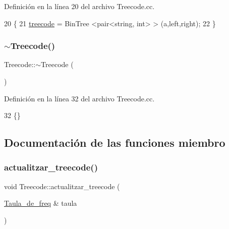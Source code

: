 Definición en la línea 20 del archivo Treecode.\+cc.


\begin{DoxyCode}
20                                                                                                            
                          \{
21     \hyperlink{class_treecode_abd4467b0a13a57fcd3bddf4a60853372}{treecode} = BinTree <pair<string, int> > (a,left,right);
22 \}
\end{DoxyCode}
\mbox{\label{class_treecode_a4b25e99b1a356dbcf9901c1e63105b1b}} 
\subsubsection{\texorpdfstring{$\sim$\+Treecode()}{~Treecode()}}
{\footnotesize\ttfamily Treecode\+::$\sim$\+Treecode (\begin{DoxyParamCaption}{ }\end{DoxyParamCaption})}



Definición en la línea 32 del archivo Treecode.\+cc.


\begin{DoxyCode}
32 \{\}
\end{DoxyCode}


\subsection{Documentación de las funciones miembro}
\mbox{\label{class_treecode_a9b9e9d2f0cce1d4293a7e28ab0ba76f7}} 
\subsubsection{\texorpdfstring{actualitzar\+\_\+treecode()}{actualitzar\_treecode()}}
{\footnotesize\ttfamily void Treecode\+::actualitzar\+\_\+treecode (\begin{DoxyParamCaption}\item[{\hyperlink{class_taula__de__freq}{Taula\+\_\+de\+\_\+freq} \&}]{taula }\end{DoxyParamCaption})}



